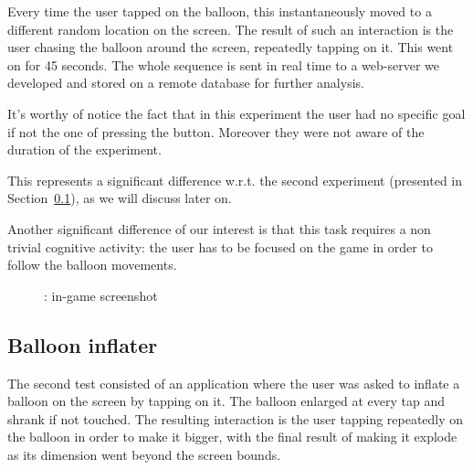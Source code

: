 Every time the user tapped on the balloon, this instantaneously moved to a different random location on the screen. The result of such an interaction is the user chasing the balloon around the screen, repeatedly tapping on it. This went on for 45 seconds.
The whole sequence is sent in real time to a web-server we developed and stored on a remote database for further analysis.

It's worthy of notice the fact that in this experiment the user had no specific goal if not the one of pressing the button. Moreover they were not aware of the duration of the experiment.

This represents a significant difference w.r.t. the second experiment (presented in Section~\ref{sec:test2}), as we will discuss later on.

Another significant difference of our interest is that this task requires a non trivial cognitive activity: the user has to be focused on the game in order to follow the balloon movements.

\begin{figure}[h!t]
\label{fig:test1}
\centering
	{\setlength{\fboxsep}{0pt}
	 }
\caption{\testfirst: in-game screenshot}
\end{figure}

\subsection{Balloon inflater}
\label{sec:test2}
The second test consisted of an application where the user was asked to inflate a balloon on the screen by tapping on it.
The balloon enlarged at every tap and shrank if not touched.
The resulting interaction is the user tapping repeatedly on the balloon in order to make it bigger, with the final result of making it explode as its dimension went beyond the screen bounds.

